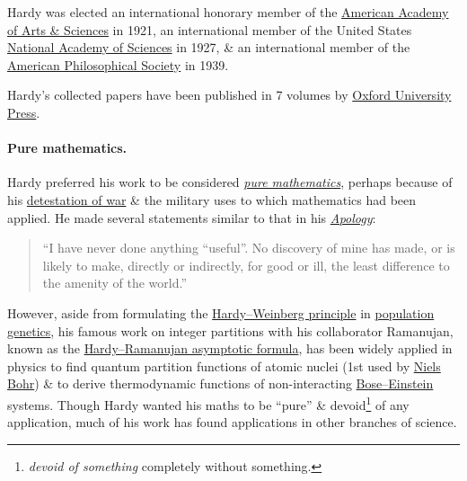 \documentclass{article}
\begin{document}
{\sc Hardy} was elected an international honorary member of the \href{https://en.wikipedia.org/wiki/American_Academy_of_Arts_and_Sciences}{American Academy of Arts \& Sciences} in 1921, an international member of the United States \href{https://en.wikipedia.org/wiki/National_Academy_of_Sciences}{National Academy of Sciences} in 1927, \& an international member of the \href{https://en.wikipedia.org/wiki/American_Philosophical_Society}{American Philosophical Society} in 1939.

{\sc Hardy}'s collected papers have been published in 7 volumes by \href{https://en.wikipedia.org/wiki/Oxford_University_Press}{Oxford University Press}.

\paragraph{Pure mathematics.} {\sc Hardy} preferred his work to be considered \href{https://en.wikipedia.org/wiki/Pure_mathematics}{\it pure mathematics}, perhaps because of his \href{https://en.wikipedia.org/wiki/Pacifism}{detestation of war} \& the military uses to which mathematics had been applied. He made several statements similar to that in his \href{https://en.wikipedia.org/wiki/A_Mathematician%27s_Apology}{\it Apology}:
\begin{quote}
	``I have never done anything ``useful''. No discovery of mine has made, or is likely to make, directly or indirectly, for good or ill, the least difference to the amenity of the world.''
\end{quote}
However, aside from formulating the \href{https://en.wikipedia.org/wiki/Hardy%E2%80%93Weinberg_principle}{Hardy--Weinberg principle} in \href{https://en.wikipedia.org/wiki/Population_genetics}{population genetics}, his famous work on integer partitions with his collaborator {\sc Ramanujan}, known as the \href{https://en.wikipedia.org/wiki/Partition_function_(number_theory)#Approximation_formulas}{Hardy--Ramanujan asymptotic formula}, has been widely applied in physics to find quantum partition functions of atomic nuclei (1st used by \href{https://en.wikipedia.org/wiki/Niels_Bohr}{\sc Niels Bohr}) \& to derive thermodynamic functions of non-interacting \href{https://en.wikipedia.org/wiki/Bose%E2%80%93Einstein_statistics}{Bose--Einstein} systems. Though {\sc Hardy} wanted his maths to be ``pure'' \& devoid\footnote{{\it devoid of something} completely without something.} of any application, much of his work has found applications in other branches of science.
\end{document}
